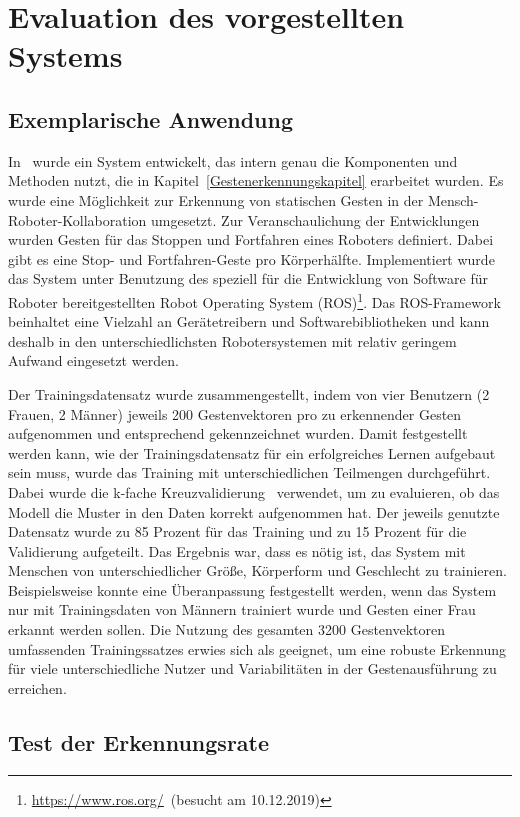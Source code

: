 \chapter{Evaluation des vorgestellten Systems}

\section{Exemplarische Anwendung}
In~\cite{flexibleSystem} wurde ein System entwickelt, das intern genau die Komponenten und Methoden nutzt, die in Kapitel~\ref{Gestenerkennungskapitel} erarbeitet wurden. Es wurde eine Möglichkeit zur Erkennung von statischen Gesten in der Mensch-Roboter-Kollaboration umgesetzt. Zur Veranschaulichung der Entwicklungen wurden Gesten für das Stoppen und Fortfahren eines Roboters definiert. Dabei gibt es eine Stop- und Fortfahren-Geste pro Körperhälfte. Implementiert wurde das System unter Benutzung des speziell für die Entwicklung von Software für Roboter bereitgestellten Robot Operating System (ROS)\footnote{\url{https://www.ros.org/}~(besucht am 10.12.2019)}. Das ROS-Framework beinhaltet eine Vielzahl an Gerätetreibern und Softwarebibliotheken und kann deshalb in den unterschiedlichsten Robotersystemen mit relativ geringem Aufwand eingesetzt werden. 

Der Trainingsdatensatz wurde zusammengestellt, indem von vier Benutzern (2 Frauen, 2 Männer) jeweils 200 Gestenvektoren pro zu erkennender Gesten aufgenommen und entsprechend gekennzeichnet wurden. Damit festgestellt werden kann, wie der Trainingsdatensatz für ein erfolgreiches Lernen aufgebaut sein muss, wurde das Training mit unterschiedlichen Teilmengen durchgeführt. Dabei wurde die k-fache Kreuzvalidierung~\cite{Kuhlmann2007} verwendet, um zu evaluieren, ob das Modell die Muster in den Daten korrekt aufgenommen hat. Der jeweils genutzte Datensatz wurde zu 85 Prozent für das Training und zu 15 Prozent für die Validierung aufgeteilt. Das Ergebnis war, dass es nötig ist, das System mit Menschen von unterschiedlicher Größe, Körperform und Geschlecht zu trainieren. Beispielsweise konnte eine Überanpassung festgestellt werden, wenn das System nur mit Trainingsdaten von Männern trainiert wurde und Gesten einer Frau erkannt werden sollen. Die Nutzung des gesamten 3200 Gestenvektoren umfassenden Trainingssatzes erwies sich als geeignet, um eine robuste Erkennung für viele unterschiedliche Nutzer und Variabilitäten in der Gestenausführung zu erreichen.~\cite{flexibleSystem}

\section{Test der Erkennungsrate}

